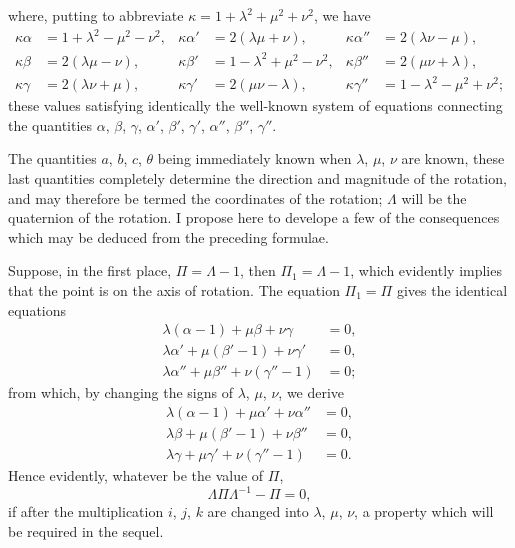 \documentclass[11pt]{article}
\begin{document}
where, putting to abbreviate $\kappa = 1 + \lambda^{2} + \mu^{2} + \nu^{2}$, we have
\begin{align*}
\kappa\alpha &= 1 + \lambda^{2} - \mu^{2} - \nu^{2}, & \kappa\alpha' &= 2(\lambda\mu + \nu), & \kappa\alpha'' &= 2(\lambda\nu - \mu),\\
\kappa\beta &= 2(\lambda\mu - \nu), & \kappa\beta' &= 1 - \lambda^{2} + \mu^{2} - \nu^{2}, & \kappa\beta'' &= 2(\mu\nu + \lambda),\\
\kappa\gamma &= 2(\lambda\nu + \mu), & \kappa\gamma' &= 2(\mu\nu - \lambda), & \kappa\gamma'' &= 1 - \lambda^{2} - \mu^{2} + \nu^{2};
\end{align*}
these values satisfying identically the well-known system of equations connecting the
quantities $\alpha$, $\beta$, $\gamma$, $\alpha'$, $\beta'$, $\gamma'$, $\alpha''$, $\beta''$, $\gamma''$.

\medskip

The quantities $a$, $b$, $c$, $\theta$ being immediately known when $\lambda$, $\mu$, $\nu$ are known, these
last quantities completely determine the direction and magnitude of the rotation, and
may therefore be termed the coordinates of the rotation; $\Lambda$ will be the quaternion of
the rotation. I propose here to develope a few of the consequences which may be
deduced from the preceding formulae.

\medskip

Suppose, in the first place, $\Pi = \Lambda - 1$, then $\Pi_{1} = \Lambda - 1$, which evidently implies
that the point is on the axis of rotation. The equation $\Pi_{1} = \Pi$ gives the identical
equations
\begin{align*}
\lambda(\alpha - 1) + \mu\beta + \nu\gamma &= 0,\\
\lambda\alpha' + \mu(\beta' - 1) + \nu\gamma' &= 0,\\
\lambda\alpha'' + \mu\beta'' + \nu(\gamma'' - 1) &= 0;
\end{align*}
from which, by changing the signs of $\lambda$, $\mu$, $\nu$, we derive
\begin{align*}
\lambda(\alpha - 1) + \mu\alpha' + \nu\alpha'' &= 0,\\
\lambda\beta + \mu(\beta' - 1) + \nu\beta'' &= 0,\\
\lambda\gamma + \mu\gamma' + \nu(\gamma'' - 1) &= 0.
\end{align*}
Hence evidently, whatever be the value of $\Pi$,
\[
\Lambda\Pi\Lambda^{-1} - \Pi = 0,
\]
if after the multiplication $i$, $j$, $k$ are changed into $\lambda$, $\mu$, $\nu$, a property which will be
required in the sequel.
\end{document}
